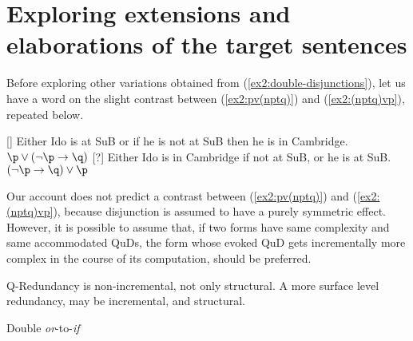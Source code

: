  
\iffalse
(\ref{ex2:pv(pvq)-repeated}-\ref{ex2:n(pvq)tp-repeated})
(\ref{ex2:pv(pvq)-repeated})
(\ref{ex2:npt(pvq)-repeated})
(\ref{ex2:pv(nptq)-repeated})
(\ref{ex2:pv(nqtp)-repeated})
(\ref{ex2:n(pvq)tp-repeated})
\fi
\section{Exploring extensions and elaborations of the target sentences}\label{sec:exploration}

Before exploring other variations obtained from (\ref{ex2:double-disjunctions}), let us have a word on the slight contrast between (\ref{ex2:pv(nptq)}) and (\ref{ex2:(nptq)vp}), repeated below.

\begin{exe}
	 {Either Ido is at SuB or if he is not at SuB then he is in Cambridge.\\ \hfill $\p \vee (\neg \p \rightarrow \q)$}
	 {Either Ido is in Cambridge if not at SuB, or he is at SuB.\\ \hfill $(\neg \p \rightarrow \q) \vee \p$}
\end{exe}

Our account does not predict a contrast between (\ref{ex2:pv(nptq)}) and (\ref{ex2:(nptq)vp}), because disjunction is assumed to have a purely symmetric effect. However, it is possible to assume that, if two forms have same complexity and same accommodated QuDs, the form whose evoked QuD gets incrementally more complex in the course of its computation, should be preferred.

\begin{exe}
	\ex{}
\end{exe}

Q-Redundancy is non-incremental, not only structural. A more surface level redundancy, may be incremental, and structural.



\begin{exe}
	\ex Double \textit{or}-to-\textit{if}
	\begin{xlist}
		\label{ex2:nptnptq}
		\label{ex2:nptnqtp}
		\label{ex2:nptnqtp}
		\label{ex2:nptnqtp}
	\end{xlist}
\end{exe}


